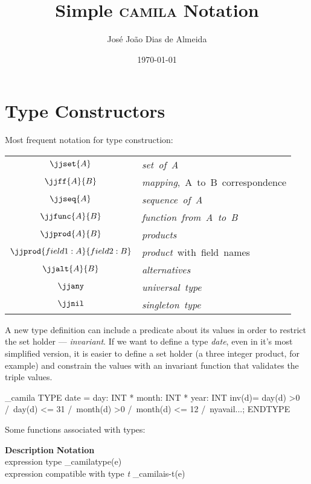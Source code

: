 \documentclass[english,a4paper]{article}
\def\camila{\textsc{camila}}
\begin{document}
\title{Simple \camila{} Notation}
\author{José João Dias de Almeida}
\date{\today}
\maketitle


\section{Type Constructors}

Most frequent notation for type construction:

\begin{center}
\begin{tabular}{|c|l|} \hline
$\jjset{A} $           & \mbox{\emph{set of A}} \\
$\jjff{A}{B}$          & \mbox{\emph{mapping}, A to B correspondence} \\
$\jjseq{A}$            & \mbox{\emph{sequence of A}}\\ 
$\jjfunc{A}{B}$        & \mbox{\emph{function from A to B}}\\ 
$\jjprod{A}{B}$        & \mbox{\emph{products}}\\ 
$\jjprod{field1 : A}{field2 : B}$ & \mbox{\emph{product} with field names}\\ 
$\jjalt{A}{B} $        & \mbox{\emph{alternatives}}\\ 
$\jjany$               & \mbox{\emph{universal type}}\\
$\jjnil$               & \mbox{\emph{singleton type}}\\
\hline
\end{tabular}
\end{center}

A new type definition can include a predicate about its values in order
to restrict the set holder --- \emph{invariant}. If we want to define a
type \emph{date}, even in it's most simplified version, it is easier to
define a set holder (a three integer product, for example) and constrain
the values with an invariant function that validates the triple values.

\_camila{
TYPE 
 date = day: INT * month: INT * year: INT
 inv(d)= day(d) >0 /\ day(d) <= 31 /\ month(d) >0 /\ month(d) <= 12 /\ nyavail{...};
ENDTYPE
}


Some functions associated with types:

\begin{framed}
\noindent \textbf{Description}  \hfill  \textbf{Notation} \ \  \\
  expression type                          \dotfill \_camila{type(e)} \\
  expression compatible with type \emph{t} \dotfill \_camila{is-t(e)}
\end{framed}
\end{document}
